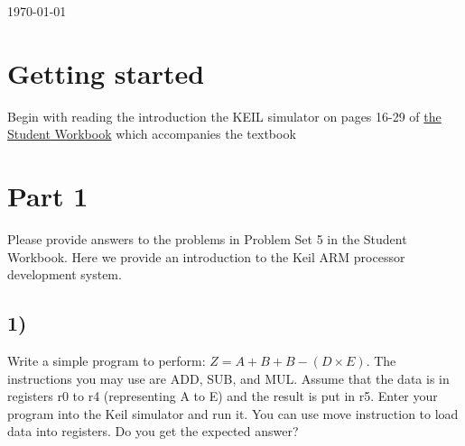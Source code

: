 \documentclass[letterpaper,12pt,titlepage]{article}
\begin{document}
\begin{titlepage}

{\large \today}\\[3cm] %


 

\vfill %

\end{titlepage}


\section*{Getting started}
Begin with reading the introduction the KEIL simulator on pages 16-29 of \href{http://academic.cengage.com/resource_uploads/downloads/1111987041_374273.pdf}{the Student Workbook}  which accompanies the textbook 

\section*{Part 1}Please provide answers to the problems in Problem Set 5 in the Student Workbook. Here we provide an introduction to the Keil ARM processor development system.


\subsection*{1)} Write a simple program to perform:  $Z = A+B+B-(D \times E)$. The instructions you may use are ADD, SUB, and MUL. Assume that the data is in registers r0 to r4 (representing A to E) and the result is put in r5. Enter your program into the Keil simulator and run it. You can use move instruction to load data into registers. Do you
get the expected answer? 
\end{document}
